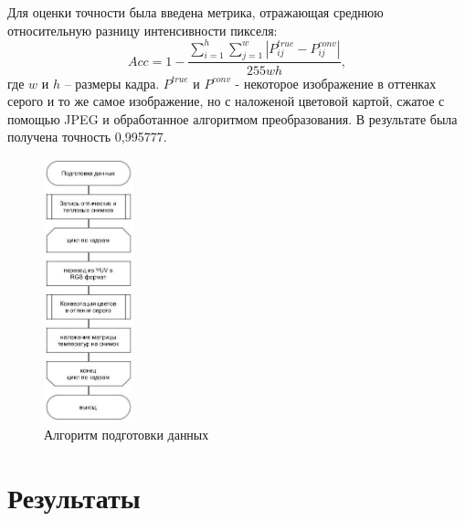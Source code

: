 \documentclass[t]{beamer}
\begin{document}
	\begin{frame}
		Для оценки точности была введена метрика, отражающая среднюю относительную разницу интенсивности пикселя:
		\begin{equation*}
			Acc = 1 - \frac{\sum\limits_{i=1}^h \sum\limits_{j=1}^w |P^{true}_{ij} - P^{conv}_{ij}|}{255wh},
			\label{eq:flanaccuracy}
		\end{equation*}
		где $w$ и $h$ -- размеры кадра. $P^{true}$ и $P^{conv}$ - некоторое изображение в оттенках серого и то же самое изображение, но с наложеной цветовой картой, сжатое с помощью JPEG и обработанное алгоритмом преобразования. В результате была получена точность 0,995777.
	\end{frame}

	\begin{frame}
		
		\begin{figure}[h!]
			\centering
			\includegraphics[width = 0.23\textwidth]{image/chapter_2/fullprepare}	
			\caption{Алгоритм подготовки данных}
			\label{fig:fullprepare}
		\end{figure}
		
	\end{frame}

\section{Результаты}
\end{document}
